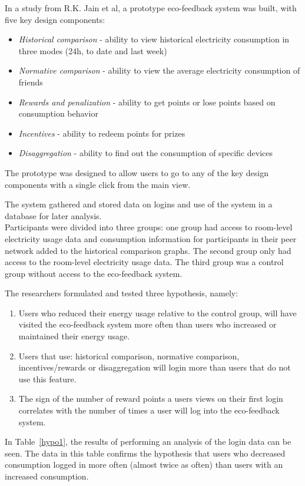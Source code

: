 \documentclass[journal]{vgtc}                %
\begin{document}
In a study from R.K. Jain et al\cite{jain2012assessing}, a prototype eco-feedback system was built, with five key design components:
\begin{itemize}
\item \textit{Historical comparison} - ability to view historical electricity consumption in three modes (24h, to date and last week)
\item \textit{Normative comparison} - ability to view the average electricity consumption of friends
\item \textit{Rewards and penalization} - ability to get points or lose points based on consumption behavior
\item \textit{Incentives} - ability to redeem points for prizes
\item \textit{Disaggregation} - ability to find out the consumption of specific devices
\end{itemize}

The prototype was designed to allow users to go to any of the key design components with a single click from the main view.

The system gathered and stored data on logins and use of the system in a database for later analysis.\\

Participants were divided into three groups: one group had access to room-level electricity usage data and consumption information for participants in their peer network added to the historical comparison graphs. 
The second group only had access to the room-level electricity usage data.
The third group was a control group without access to the eco-feedback system.

The researchers formulated and tested three hypothesis, namely:
\begin{enumerate}
\item Users who reduced their energy usage relative to the control group, will have visited the eco-feedback system more often than users who increased or maintained their energy usage.
\item Users that use: historical comparison, normative comparison, incentives/rewards or disaggregation will login more than users that do not use this feature.
\item The sign of the number of reward points a users views on their first login correlates with the number of times a user will log into the eco-feedback system.
\end{enumerate}

In Table~\ref{hypo1}, the results of performing an analysis of the login data can be seen. The data in this table confirms the hypothesis that users who decreased consumption logged in more often (almost twice as often) than users with an increased consumption. \\
\end{document}
